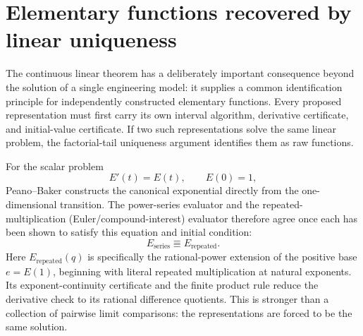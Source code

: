 \section{Elementary functions recovered by linear uniqueness}

\begin{theorem}
\label{thm:linear-ode-elementary-function-agreement}
The continuous linear theorem has a deliberately important consequence beyond
the solution of a single engineering model: it supplies a common
identification principle for independently constructed elementary functions.
Every proposed representation must first carry its own interval algorithm,
derivative certificate, and initial-value certificate.  If two such
representations solve the same linear problem, the factorial-tail uniqueness
argument identifies them as raw functions.

For the scalar problem
\[
 E'(t)=E(t),\qquad E(0)=1,
\]
Peano--Baker constructs the canonical exponential directly from the
one-dimensional transition.  The power-series evaluator and the
repeated-multiplication (Euler/compound-interest) evaluator therefore agree
once each has been shown to satisfy this equation and initial condition:
\[
 E_{\mathrm{series}}
 \Equiv E_{\mathrm{repeated}}.
\]
Here \(E_{\mathrm{repeated}}(q)\) is specifically the rational-power
extension of the positive base \(e=E(1)\), beginning with literal repeated
multiplication at natural exponents.  Its exponent-continuity certificate and
the finite product rule reduce the derivative check to its rational
difference quotients.  This is stronger than a collection of pairwise limit
comparisons: the representations are forced to be the same solution.


\end{theorem}
